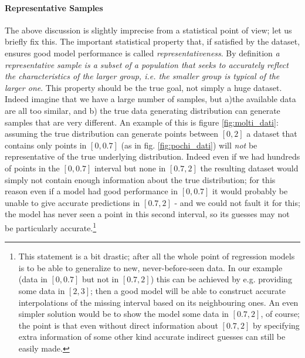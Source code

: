 \paragraph{Representative Samples}
The above discussion is slightly imprecise from a statistical point of view; let us briefly fix this.
The important statistical property that, if satisfied by the dataset, ensures good model performance is called \emph{representativeness}. By definition \emph{a representative sample is a subset of a population that seeks to accurately reflect the characteristics of the larger group, i.e. the smaller group is typical of the larger one}. This property should be the true goal, not simply a huge dataset. Indeed imagine that we have a large number of samples, but  a)the available data are all too similar, and b) the true data generating distribution can generate samples that are very different. An example of this is figure \ref{fig:molti_dati}: assuming the true distribution can generate points between $[0, 2]$ a dataset that contains only points in $[0, 0.7]$ (as in fig. \ref{fig:pochi_dati}) will \emph{not} be representative of the true underlying distribution. Indeed even if we had hundreds of points in the $[0, 0.7]$ interval but none in $[0.7, 2]$ the resulting dataset would simply not contain enough information about the true distribution; for this reason even if a model had good performance in $[0, 0.7]$ it would probably be unable to give accurate predictions in $[0.7, 2]$ - and we could not fault it for this; the model has never seen a point in this second interval, so its guesses may not be particularly accurate.\footnote{This statement is a bit drastic; after all the whole point of regression models is to be able to generalize to new, never-before-seen data. In our example (data in $[0, 0.7]$ but not in $[0.7, 2]$) this can be achieved by e.g. providing some data in $[2, 3]$; then a good model will be able to construct accurate interpolations of the missing interval based on its neighbouring ones. An even simpler solution would be to show the model some data in $[0.7, 2]$, of course; the point is that even without direct information about $[0.7, 2]$ by specifying extra information of some other kind accurate indirect guesses can still be easily made.}

